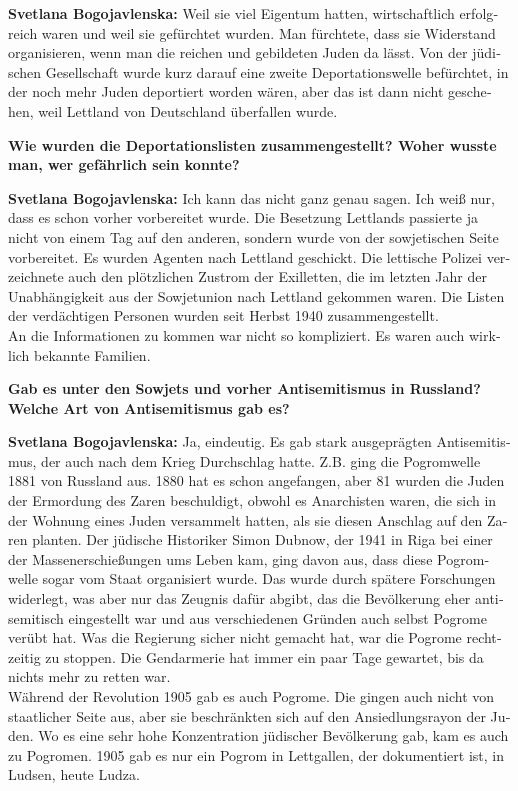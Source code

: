 \begin{otherlanguage}{ngerman}
\textbf{Svetlana Bogojavlenska:} Weil sie viel Eigentum hatten, wirtschaftlich erfolgreich waren und weil sie gefürchtet wurden. Man fürchtete, dass sie Widerstand organisieren, wenn man die reichen und gebildeten Juden da lässt. Von der jüdischen Gesellschaft wurde kurz darauf eine zweite Deportationswelle befürchtet, in der noch mehr Juden deportiert worden wären, aber das ist dann nicht geschehen, weil Lettland von Deutschland überfallen wurde.

\textbf{Wie wurden die Deportationslisten zusammengestellt? Woher wusste man, wer gefährlich sein konnte?} 

\textbf{Svetlana Bogojavlenska:} Ich kann das nicht ganz genau sagen. Ich weiß nur, dass es schon vorher vorbereitet wurde. Die Besetzung Lettlands passierte ja nicht von einem Tag auf den anderen, sondern wurde von der sowjetischen Seite vorbereitet. Es wurden Agenten nach Lettland geschickt. Die lettische Polizei verzeichnete auch den plötzlichen Zustrom der Exilletten, die im letzten Jahr der Unabhängigkeit aus der Sowjetunion nach Lettland gekommen waren. Die Listen der verdächtigen Personen wurden seit Herbst 1940 zusammengestellt.\\
An die Informationen zu kommen war nicht so kompliziert. Es waren auch wirklich bekannte Familien.

\textbf{Gab es unter den Sowjets und vorher Antisemitismus in Russland? Welche Art von Antisemitismus gab es?}

\textbf{Svetlana Bogojavlenska:} Ja, eindeutig. Es gab stark ausgeprägten Antisemitismus, der auch nach dem Krieg Durchschlag hatte. Z.B. ging die Pogromwelle 1881 von Russland aus. 1880 hat es schon angefangen, aber 81 wurden die Juden der Ermordung des Zaren beschuldigt, obwohl es Anarchisten waren, die sich in der Wohnung eines Juden versammelt hatten, als sie diesen Anschlag auf den Zaren planten. Der jüdische Historiker Simon Dubnow, der 1941 in Riga bei einer der Massenerschießungen ums Leben kam, ging davon aus, dass diese Pogromwelle sogar vom Staat organisiert wurde. Das wurde durch spätere Forschungen widerlegt, was aber nur das Zeugnis dafür abgibt, das die Bevölkerung eher antisemitisch eingestellt war und aus verschiedenen Gründen auch selbst Pogrome verübt hat. Was die Regierung sicher nicht gemacht hat, war die Pogrome rechtzeitig zu stoppen. Die Gendarmerie hat immer ein paar Tage gewartet, bis da nichts mehr zu retten war.\\
Während der Revolution 1905 gab es auch Pogrome. Die gingen auch nicht von staatlicher Seite aus, aber sie beschränkten sich auf den Ansiedlungsrayon der Juden. Wo es eine sehr hohe Konzentration jüdischer Bevölkerung gab, kam es auch zu Pogromen. 1905 gab es nur ein Pogrom in Lettgallen, der dokumentiert ist, in Ludsen, heute Ludza. 


\end{otherlanguage}
